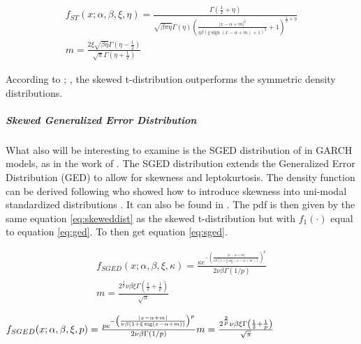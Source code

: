 \documentclass[a4paper, twoside]{templates/ociamthesis}
\begin{document}
\begin{equation}
\begin{array}{c}f_{S T}(x ; \alpha, \beta, \xi, \eta)=\frac{\Gamma\left(\frac{1}{2}+\eta\right)}{\sqrt{\beta\pi \eta} \Gamma(\eta)\left(\frac{|x-\alpha+m|^{2}}{\eta\beta(\xi \operatorname{sign}(x-\alpha+m)+1)^{2}}+1\right)^{\frac{1}{2}+\eta}} \\m=\frac{2 \xi \sqrt{\beta\eta} \Gamma\left(\eta-\frac{1}{2}\right)}{\sqrt{\pi} \Gamma\left(\eta+\frac{1}{2}\right)}\end{array}
 \label{eq:stdist}
\end{equation}

\noindent According to \textcite{giot2003}; \textcite{giot2004}, the skewed t-distribution outperforms the symmetric density distributions.

\hypertarget{skewed-generalized-error-distribution}{%
\subparagraph{Skewed Generalized Error Distribution}\label{skewed-generalized-error-distribution}}

\noindent What also will be interesting to examine is the SGED distribution of \textcite{theodossiou2000} in GARCH models, as in the work of \textcite{lee2008}. The SGED distribution extends the Generalized Error Distribution (GED) to allow for skewness and leptokurtosis. The density function can be derived following \textcite{fernández1998} who showed how to introduce skewness into uni-modal standardized distributions \autocite{trottier2015}. It can also be found in \textcite{theodossiou2000}. The pdf is then given by the same equation \eqref{eq:skeweddist} as the skewed t-distribution but with \(f_1(\cdot)\) equal to equation \eqref{eq:ged}. To then get equation \eqref{eq:sged}.

\begin{equation}
\begin{array}{c}
f_{S G E D}(x ; \alpha, \beta, \xi, \kappa)=\frac{\kappa e^{-\left(\frac{|x-\alpha+m|}{\nu \beta(1+\xi \operatorname{sig}(x-\alpha+m))}\right)^{p}}}{2 \nu \beta \Gamma(1 / p)} \\
m=\frac{2^{\frac{2}{p}} \nu \beta \xi \Gamma\left(\frac{1}{2}+\frac{1}{p}\right)}{\sqrt{\pi}}
\end{array}
\label{eq:sged}
\end{equation}

\(f_{S G E D}(x ; \alpha, \beta, \xi, p)=\frac{p e^{-\left(\frac{|x-\alpha+m|}{\nu \beta(1+\xi \operatorname{sig}(x-\alpha+m))}\right)^{p}}}{2 \nu \beta \Gamma(1 / p)} \\m=\frac{2^{\frac{2}{p}} \nu \beta \xi \Gamma\left(\frac{1}{2}+\frac{1}{p}\right)}{\sqrt{\pi}}\)
\end{document}
